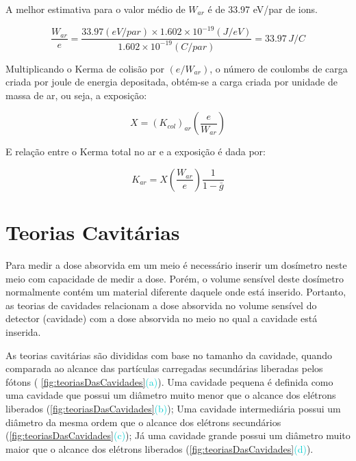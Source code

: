 \documentclass[11pt,a4paper]{article}
\newcounter{exemplo}
\begin{document}
		\begin{exemplo}
			A melhor estimativa para o valor médio de $W_{ar}$ é de 33.97 eV/par de ions.

			\begin{equation}
				\frac{W_{ar}}{e} 
				= \frac{33.97 (eV/par)\times 1.602 \times 10^{-19} (J/eV)}{1.602 \times 10^{-19}(C/par)}
				= 33.97 \, J/C
			\end{equation}
		\end{exemplo}

		Multiplicando o Kerma de colisão por $(e/W_{ar})$, o número de coulombs de carga criada por joule de energia depositada, obtém-se a carga criada por unidade de massa de ar, ou seja, a exposição:

			\begin{equation}
				X = (K_{col})_{ar} \left(\frac{e}{W_{ar}}\right)
			\end{equation}

		E relação entre o Kerma total no ar e a exposição é dada por:

			\begin{equation}
				K_{ar} = X \left(\frac{W_{ar}}{e}\right) \frac{1}{1 - \bar{g}}
			\end{equation}

	\section{Teorias Cavitárias}

		Para medir a dose absorvida em um meio é necessário inserir um dosímetro neste meio com capacidade de medir a dose. Porém, o volume sensível deste dosímetro normalmente contém um material diferente daquele onde está inserido. Portanto, as teorias de cavidades relacionam a dose absorvida no volume sensível do detector (cavidade) com a dose absorvida no meio no qual a cavidade está inserida. 

		As teorias cavitárias são divididas com base no tamanho da cavidade, quando comparada ao alcance das partículas carregadas secundárias liberadas pelos fótons (  \ref{fig:teoriasDasCavidades}\textcolor{DarkTurquoise}{(a)}). Uma cavidade pequena é definida como uma cavidade que possui um diâmetro muito menor que o alcance dos elétrons liberados (\ref{fig:teoriasDasCavidades}\textcolor{DarkTurquoise}{(b)}); Uma cavidade intermediária possui um diâmetro da mesma ordem que o alcance dos elétrons secundários (\ref{fig:teoriasDasCavidades}\textcolor{DarkTurquoise}{(c)}); Já uma cavidade grande possui um diâmetro muito maior que o alcance dos elétrons liberados (\ref{fig:teoriasDasCavidades}\textcolor{DarkTurquoise}{(d)}). 
\end{document}

